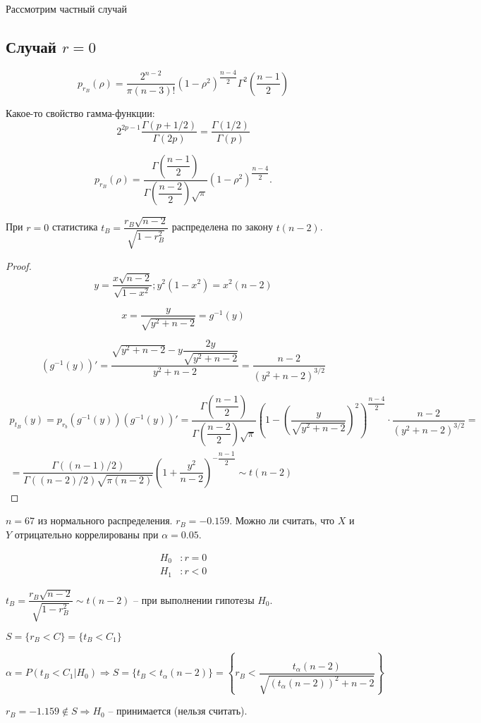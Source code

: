 Рассмотрим частный случай
\subsection{Случай $r=0$}

\[
  p_{r_B} (\rho) = \dfrac{2^{n-2}}{\pi (n-3)!}
  (1-\rho^2)^{\dfrac{n-4}{2}}
  \Gamma^2\left(\dfrac{n-1}{2}\right)
\]

Какое-то свойство гамма-функции:
\[
  2^{2p-1} \dfrac{\Gamma(p+1/2)}{\Gamma(2p)} = \dfrac{\Gamma(1/2)}{\Gamma(p)}
\]

\[
  p_{r_B} (\rho) = \dfrac{\Gamma(\dfrac{n-1}{2})}{\Gamma(\dfrac{n-2}{2}) \sqrt{\pi}} (1-\rho^2)^{\dfrac{n-4}{2}}.
\]


\begin{theorem}
  При $r=0$ статистика $t_B = \dfrac{r_B \sqrt{n-2}}{\sqrt{1 - r_B^2}}$
  распределена по закону $t(n-2)$.
\end{theorem}

\begin{proof}
  \[
    y = \dfrac{x \sqrt{n-2}}{\sqrt{1-x^2}}; y^2 (1-x^2) = x^2 (n-2)
  \]

  \[
    x = \dfrac{y}{\sqrt{y^2+n-2}} = g^{-1} (y)
  \]

  \[
    (g^{-1} (y))' = \dfrac{\sqrt{y^2+n-2} - y \dfrac{2y}{\sqrt{y^2+n-2}} }{y^2+n-2} = \dfrac{n-2}{(y^2 + n - 2)^{3/2}}
  \]

  \begin{multline*}
    p_{t_B} (y) = p_{r_b} (g^{-1}(y)) (g^{-1}(y))'
    = \dfrac{\Gamma(\dfrac{n-1}{2})}{\Gamma(\dfrac{n-2}{2}) \sqrt{\pi}}
    (1-(\dfrac{y}{\sqrt{y^2+n-2}})^2)^{\dfrac{n-4}{2}} \cdot
    \dfrac{n-2}{(y^2 + n - 2)^{3/2}} = \\
    = \dfrac{\Gamma\left((n-1)/2\right)}{\Gamma\left((n-2)/2\right) \sqrt{\pi (n-2)}} \left(1 + \dfrac{y^2}{n-2}\right)^{-\dfrac{n-1}{2}} \sim t(n-2)
  \end{multline*}
\end{proof}

\begin{ex}
  $n=67$ из нормального распределения. $r_B = -0.159$. Можно ли считать, что $X$ и $Y$ отрицательно коррелированы при $\alpha = 0.05$.

  \begin{align*}
    H_0 &: r = 0 \\
    H_1 &: r < 0
  \end{align*}

  $t_B = \dfrac{r_B \sqrt{n-2}}{\sqrt{1-r_B^2}} \sim t(n-2)$ -- при выполнении гипотезы $H_0$.

  $S = \{r_B < C\} = \{ t_B < C_1\}$

  \[
    \alpha = P(t_B < C_1 | H_0) \Rightarrow S = \{ t_B < t_\alpha (n-2) \} = 
    \left\{ r_B < \dfrac{t_\alpha (n-2)}{\sqrt{ (t_\alpha(n-2))^2 + n-2 }}\right\}
  \]

  $r_B = -1.159 \notin S \Rightarrow H_0$ -- принимается (нельзя считать). 
\end{ex}

